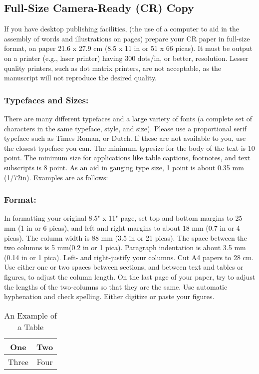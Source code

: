 \documentclass[a4paper, 10pt, conference]{ieeeconf}      %
\begin{document}
\subsection{Full-Size Camera-Ready (CR) Copy}

If you have desktop publishing facilities, (the use of a computer to aid
 in the assembly of words and illustrations on pages) prepare your CR paper
  in full-size format, on paper 21.6 x 27.9 cm (8.5 x 11 in or 51 x 66 picas).
  It must be output on a printer (e.g., laser printer) having 300 dots/in, or
  better, resolution. Lesser quality printers, such as dot matrix printers,
   are not acceptable, as the manuscript will not reproduce the desired quality.

\subsubsection{Typefaces and Sizes:} There are many different typefaces and a large
variety of fonts (a complete set of characters in the same typeface, style,
 and size). Please use a proportional serif typeface such as Times Roman,
 or Dutch. If these are not available to you, use the closest typeface you
  can. The minimum typesize for the body of the text is 10 point. The minimum
  size for applications like table captions, footnotes, and text subscripts
  is 8 point. As an aid in gauging type size, 1 point is about 0.35 mm (1/72in).
   Examples are as follows:

\subsubsection{Format:} In formatting your original 8.5" x 11" page, set top and
bottom margins to 25 mm (1 in or 6 picas), and left and right margins
to about 18 mm (0.7 in or 4 picas). The column width is 88 mm (3.5 in or 21 picas).
 The space between the two columns is 5 mm(0.2 in or 1 pica). Paragraph
 indentation is about 3.5 mm (0.14 in or 1 pica). Left- and right-justify your
 columns. Cut A4 papers to 28 cm. Use either one or two spaces between sections,
 and between text and tables or figures, to adjust the column length.
  On the last page of your paper, try to adjust the lengths of the
  two-columns so that they are the same. Use automatic hyphenation and
   check spelling. Either digitize or paste your figures.

\begin{table}
\caption{An Example of a Table}
\label{table_example}
\begin{center}
\begin{tabular}{|c||c|}
\hline
One & Two\\
\hline
Three & Four\\
\hline
\end{tabular}
\end{center}
\end{table}
\end{document}
